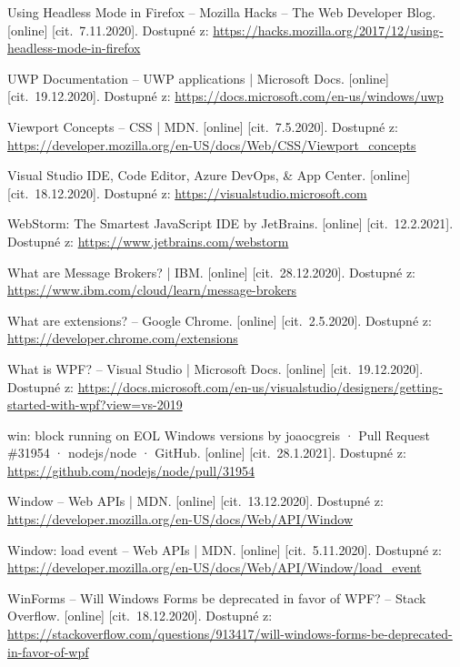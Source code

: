 \begin{flushleft}
\begin{thebibliography}{99}
 Using Headless Mode in Firefox -- Mozilla Hacks -- The Web Developer Blog. [online] [cit.~7.11.2020]. Dostupné z: \url{https://hacks.mozilla.org/2017/12/using-headless-mode-in-firefox}

 UWP Documentation -- UWP applications | Microsoft Docs. [online] [cit.~19.12.2020]. Dostupné z: \url{https://docs.microsoft.com/en-us/windows/uwp}

 Viewport Concepts -- CSS | MDN. [online] [cit.~7.5.2020]. Dostupné z: \url{https://developer.mozilla.org/en-US/docs/Web/CSS/Viewport_concepts}

 Visual Studio IDE, Code Editor, Azure DevOps, \& App Center. [online] [cit.~18.12.2020]. Dostupné z: \url{https://visualstudio.microsoft.com}

 WebStorm: The Smartest JavaScript IDE by JetBrains. [online] [cit.~12.2.2021]. Dostupné z: \url{https://www.jetbrains.com/webstorm}

 What are Message Brokers? | IBM. [online] [cit.~28.12.2020]. Dostupné z: \url{https://www.ibm.com/cloud/learn/message-brokers}

 What are extensions? -- Google Chrome. [online] [cit.~2.5.2020]. Dostupné z: \url{https://developer.chrome.com/extensions}

 What is WPF? -- Visual Studio | Microsoft Docs. [online] [cit.~19.12.2020]. Dostupné z: \url{https://docs.microsoft.com/en-us/visualstudio/designers/getting-started-with-wpf?view=vs-2019}

win: block running on EOL Windows versions by joaocgreis · Pull Request \#31954 · nodejs/node · GitHub. [online] [cit.~28.1.2021]. Dostupné z: \url{https://github.com/nodejs/node/pull/31954}

 Window -- Web APIs | MDN. [online] [cit.~13.12.2020]. Dostupné z: \url{https://developer.mozilla.org/en-US/docs/Web/API/Window}

 Window: load event -- Web APIs | MDN. [online] [cit.~5.11.2020]. Dostupné z: \url{https://developer.mozilla.org/en-US/docs/Web/API/Window/load_event}

 WinForms -- Will Windows Forms be deprecated in favor of WPF? -- Stack Overflow. [online] [cit.~18.12.2020]. Dostupné z: \url{https://stackoverflow.com/questions/913417/will-windows-forms-be-deprecated-in-favor-of-wpf}


\end{thebibliography}
\end{flushleft}
